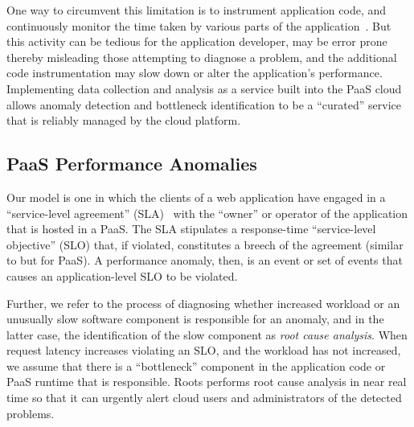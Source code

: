 One way to circumvent this 
limitation is to instrument application code, and continuously monitor the time taken by various
parts of the application~\cite{newrelic,datadog,dynatrace}. 
But this activity can be tedious for the application developer, 
may be error prone thereby misleading those attempting to
diagnose a problem, and
the additional code instrumentation may slow down or alter the application's
performance. 
Implementing data collection and analysis as a service built into the PaaS cloud allows 
anomaly detection and bottleneck identification to be a ``curated'' service that is 
reliably managed by the cloud platform.

\subsection{PaaS Performance Anomalies}


Our model is
one in which the clients of a web application have engaged in a
``service-level agreement'' (SLA)~\cite{Keller:2003:WFS:635430.635442}
with the ``owner'' or operator of the application that is hosted in a PaaS.  The SLA
stipulates a response-time ``service-level objective'' (SLO) that, if violated, constitutes a breech of the
agreement (similar to \cite{Nguyen:2011:PPR:2038633.2038634} but for PaaS).  A performance anomaly, then, is an event or set of events that
causes an application-level SLO to be violated.

Further, we refer to the process
of diagnosing whether increased workload or an unusually slow software component is responsible for
an anomaly, and in the latter case, the identification of the slow component
as \textit{root cause analysis}.  When request latency increases violating an SLO,
and the workload has not increased, we assume that there is a ``bottleneck''
component in the application code or PaaS runtime that is responsible.  Roots
performs root cause analysis in near real time so
that it can urgently alert cloud users and administrators of the detected problems.

